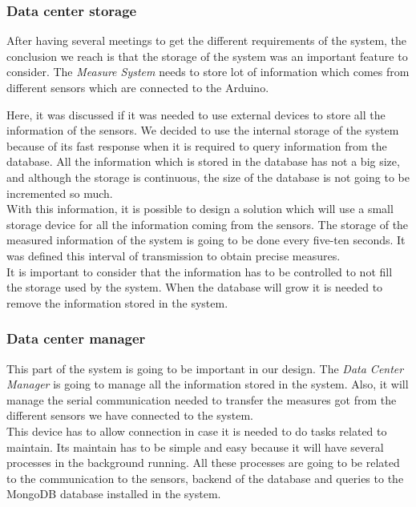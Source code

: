 \subsubsection{Data center storage}

After having several meetings to get the different requirements of the system, the conclusion we reach is that the storage of the system was an important feature to consider. The \textit{Measure System} needs to store lot of information which comes from  different sensors which are connected to the Arduino.

Here, it was discussed if it was needed to use external devices to store all the information of the sensors. We decided to use the internal storage of the system because of its fast response when it is required to query information from the database. All the information which is stored in the database has not a big size, and although the storage is continuous, the size of the database is not going to be incremented so much.\\

With this information, it is possible to design a solution which will use a small storage device for all the information coming from the sensors. The storage of the measured information of the system is going to be done every five-ten seconds. It was defined this interval of transmission to obtain precise measures.\\

It is important to consider that the information has to be controlled to not fill the storage used by the system. When the database will grow it is needed to remove the information stored in the system. 

\subsubsection{Data center manager}

This part of the system is going to be important in our design. The \textit{Data Center Manager} is going to manage all the information stored in the system. Also, it will manage the serial communication needed to transfer the measures got from the different sensors we have connected to the system.\\

This device has to allow connection in case it is needed to do tasks related to maintain. Its maintain has to be simple and easy because it will have several processes in the background running. All these processes are going to be related to the communication to the sensors, backend of the database and queries to the MongoDB database installed in the system.\\

